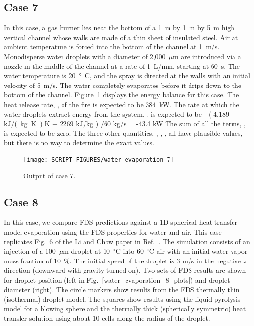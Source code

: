 \documentclass[11pt]{book}
\begin{document}
\subsection{Case 7}
\label{water_evaporation_7}

In this case, a gas burner lies near the bottom of a 1~m by 1~m by 5~m high vertical channel whose walls are made of a thin sheet of insulated steel. Air at ambient temperature is forced into the bottom of the channel at 1~m/s. Monodisperse water droplets with a diameter of 2,000~$\mu$m are
introduced via a nozzle in the middle of the channel at a rate of 1~L/min, starting at 60~s. The water temperature is 20~\si{\degree C}, and the spray is directed at the walls with an initial velocity of 5~m/s.
The water completely evaporates before it drips down to the bottom of the channel.
Figure~\ref{water_evaporation_7_plot} displays the energy balance for this case. The heat release rate, , of the fire is expected to be 384~kW. The rate at which the water droplets extract energy from the system, , is expected to be
\be - \left( 4.189 \; \hbox{\si{kJ/(kg.K)}}  \; \hbox{K} + 2269 \; \hbox{kJ/kg} \right) /60 \; \hbox{kg/s} = -43.4 \; \hbox{kW} \ee
The sum of all the terms, , is expected to be zero. The three other quantities, , , , all have plausible values, but there is no way to determine the exact values.

\begin{figure}[h!]
\centering
\texttt{[image: SCRIPT\_FIGURES/water\_evaporation\_7]}
\caption[Sample case ]{Output of  case 7.}
\label{water_evaporation_7_plot}
\end{figure}


\subsection{Case 8}
\label{water_evaporation_8}

In this case, we compare FDS predictions against a 1D spherical heat transfer model evaporation using the FDS properties for water and air. This case replicates Fig.~6 of the Li and Chow paper in Ref.~\cite{LiChow:2008}.  The simulation consists of an injection of a 100~$\mu$m droplet at 10~$^\circ$C into 60~$^\circ$C air with an initial water vapor mass fraction of 10~\%. The initial speed of the droplet is 3 m/s in the negative $z$ direction (downward with gravity turned on).  Two sets of FDS results are shown for droplet position (left in Fig.~\ref{water_evaporation_8_plots}) and droplet diameter (right).  The circle markers show results from the FDS thermally thin (isothermal) droplet model. The squares show results using the liquid pyrolysis model for a blowing sphere and the thermally thick (spherically symmetric) heat transfer solution using about 10 cells along the radius of the droplet.
\end{document}
